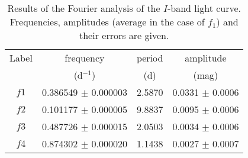 \documentclass[useAMS,usenatbib]{mn2e}
\begin{document}







  \begin{table}
\centering
 \caption{Results of the Fourier analysis of the $I$-band light curve. Frequencies, amplitudes (average in the case of $f_1$) and their errors are given. }
 \begin{tabular}{@{}cccc@{}}
 \hline
Label&frequency & period &amplitude  \\
 &(d$^{-1}$)  &(d) & (mag)  \\
\hline
$f1$&	0.386549 $\pm$ 0.000003&2.5870 &   0.0331 $\pm$ 0.0006 \\
$f2$&	0.101177 $\pm$ 0.000005&9.8837	&  0.0095 $\pm$ 0.0006 \\	 
$f3$&	0.487726  $\pm$ 0.000015 &2.0503	&  0.0034  $\pm$  0.0006\\
$f4$&	0.874302 $\pm$ 0.000020&1.1438	&  0.0027  $\pm$ 0.0007\\
\hline
\end{tabular}
\end{table}
\end{document}
